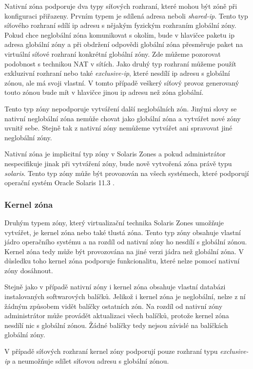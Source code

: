 Nativní zóna podporuje dva typy síťových rozhraní, které mohou být zóně při konfiguraci přiřazeny. Prvním typem je sdílená 
adresa neboli \textit{shared-ip}. Tento typ síťového rozhraní sdílí ip adresu s nějakým fyzickým rozhraním globální zóny. 
Pokud chce neglobální zóna komunikovat s okolím, bude v hlavičce paketu ip adresa globální zóny a při obdržení odpovědi
globální zóna přesměruje paket na virtuální síťové rozhraní konkrétní globální zóny. Zde můžeme pozorovat podobnost s
technikou NAT v sítích. Jako druhý typ rozhraní můžeme použít exkluzivní rozhraní nebo také \textit{exclusive-ip}, které
nesdílí ip adresu s globální zónou, ale má svoji vlastní. V tomto případě veškerý síťový provoz generovaný touto zónou bude
mít v hlavičce jinou ip adresu než zóna globální.

Tento typ zóny nepodporuje vytváření další neglobálních zón. Jinými slovy se nativní neglobální zóna nemůže chovat jako
globální zóna a vytvářet nové zóny uvnitř sebe. Stejně tak z nativní zóny nemůžeme vytvářet ani spravovat jiné neglobální zóny.

Nativní zóna je implicitní typ zóny v Solaris Zones a pokud administrátor nespecifikuje jinak při vytváření zóny, bude nově
vytvořená zóna právě typu \textit{solaris}. Tento typ zóny může být provozován na všech systémech, které podporují operační
systém Oracle Solaris 11.3 \cite{oracle:solaris:zones:brands}.
\subsubsection{Kernel zóna}
\label{chapter:zones:kernel}
Druhým typem zóny, který virtualizační technika Solaris Zones umožňuje vytvářet, je kernel zóna nebo také tlustá zóna. Tento
typ zóny obsahuje vlastní jádro operačního systému a na rozdíl od nativní zóny ho nesdílí s globální zónou. Kernel zóna
tedy může být provozována na jiné verzi jádra než globální zóna. V důsledku toho kernel zóna podporuje funkcionalitu,
které nelze pomocí nativní zóny dosáhnout.

Stejně jako v případě nativní zóny i kernel zóna obsahuje vlastní databázi instalovaných softwarových balíčků. Jelikož i 
kernel zóna je neglobální, nelze z ní žádným způsobem vidět balíčky ostatních zón. Na rozdíl od nativní zóny administrátor
může provádět aktualizaci všech balíčků, protože kernel zóna nesdílí nic s globální zónou. Žádné balíčky tedy nejsou závislé
na balíčkách globální zóny.

V případě síťových rozhraní kernel zóny podporují pouze rozhraní typu \textit{exclusive-ip} a neumožňuje sdílet síťovou adresu
s globální zónou.

